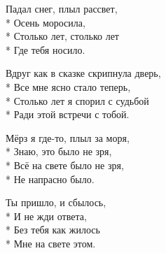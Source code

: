 \medskip

\begin{minipage}{\linewidth}
Падал снег, плыл рассвет,\\*
Осень моросила,\\*
Столько лет, столько лет\\*
Где тебя носило.\\
\end{minipage}\par\medskip\nobreak

\medskip

\begin{minipage}{\linewidth}
\hspace*{1.5em}Вдруг как в сказке скрипнула дверь,\\*
\hspace*{1.5em}Все мне ясно стало теперь,\\*
\hspace*{1.5em}Столько лет я спорил с судьбой\\*
\hspace*{1.5em}Ради этой встречи с тобой.\\
\end{minipage}\par\medskip\nobreak

\medskip

\begin{minipage}{\linewidth}
\hspace*{1.5em}Мёрз я где-то, плыл за моря,\\*
\hspace*{1.5em}Знаю, это было не зря,\\*
\hspace*{1.5em}Всё на свете было не зря,\\*
\hspace*{1.5em}Не напрасно было.\\
\end{minipage}\par\medskip\nobreak

\medskip

\begin{minipage}{\linewidth}
Ты пришло, и сбылось,\\*
И не жди ответа,\\*
Без тебя как жилось\\*
Мне на свете этом.\\
\end{minipage}\par\medskip\nobreak


